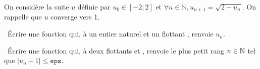On considère la suite $u$ définie par $u_0 \in [-2;2]$ et $\forall n \in \mathbb{N}, u_{n+1} = \sqrt{2-u_n}$.
On rappelle que $u$ converge vers 1.


\question\ \'Ecrire une fonction  qui, à un entier naturel  et un flottant , renvoie  $u_n$.

\question\ \'Ecrire une fonction  qui, à deux flottants  et , renvoie le plus petit rang $n\in \mathbb{N}$ tel que $\left| u_n - 1 \right| \leq \texttt{eps}$.